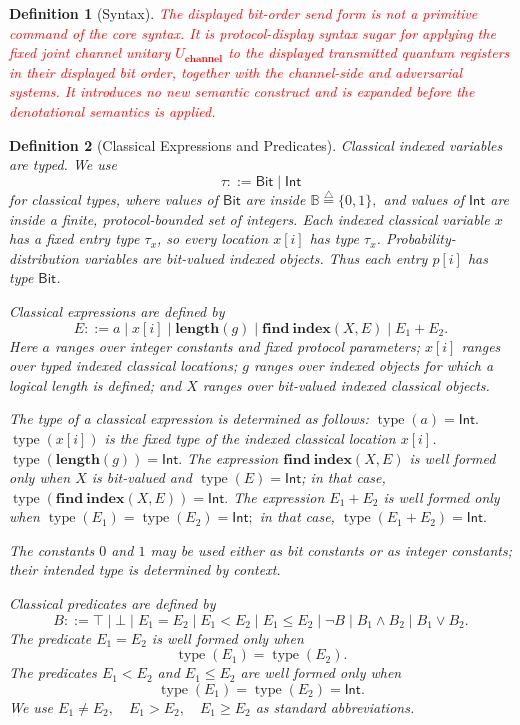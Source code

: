 \documentclass[acmsmall,screen,review,anonymous,nonacm]{acmart}
\newtheorem{definition}{Definition}[section]
\theoremstyle{defn_style}
\begin{document}
\begin{definition}[Syntax]
\textcolor{red}{The displayed bit-order send form is not a primitive command of the core syntax.  It is protocol-display syntax sugar for applying the fixed joint channel unitary \(U_{\textbf{channel}}\) to the displayed transmitted quantum registers in their displayed bit order, together with the channel-side and adversarial systems.  It introduces no new semantic construct and is expanded before the denotational semantics is applied.}
\end{definition}


\begin{definition}[Classical Expressions and Predicates]

Classical indexed variables are typed. We use
\[
\tau ::= \mathsf{Bit}\mid \mathsf{Int}
\]
for classical types, where
values of \(\mathsf{Bit}\) are inside \(
\mathbb B
\stackrel{\triangle}{=}
\{0,1\},\)
and values of \({\mathsf{Int}}\) are inside a finite, protocol-bounded set of integers. Each indexed classical variable \(x\) has a fixed entry type
\(\tau_x\), so every location \(x[i]\) has type \(\tau_x\). Probability-distribution variables are bit-valued indexed objects. Thus each
entry \(p[i]\) has type \(\mathsf{Bit}\).


Classical expressions are defined by
\[
E ::=
a
\mid x[i]
\mid \mathbf{length}(g)
\mid \mathbf{find~index}(X,E)
\mid E_1+E_2 .
\]
Here \(a\) ranges over integer constants and fixed protocol parameters;
\(x[i]\) ranges over typed indexed classical locations; \(g\) ranges over indexed objects for which a logical length is defined; and \(X\) ranges over
bit-valued indexed classical objects.

The type of a classical expression is determined as follows: \(\operatorname{type}(a)=\mathsf{Int}.\) \(\operatorname{type}(x[i])\) 
is the fixed type of the indexed classical location \(x[i]\). \(\operatorname{type}(\mathbf{length}(g))=\mathsf{Int}.\)
The expression \(\mathbf{find~index}(X,E)\)
is well formed only when \(X\) is bit-valued and
\(\operatorname{type}(E)=\mathsf{Int}\); in that case,
\(\operatorname{type}(\mathbf{find~index}(X,E))=\mathsf{Int}.\)
The expression \(E_1+E_2\) is well formed only when
\(\operatorname{type}(E_1)=\operatorname{type}(E_2)=\mathsf{Int};\)
in that case,
\(\operatorname{type}(E_1+E_2)=\mathsf{Int}.\)

The constants \(0\) and \(1\) may be used either as bit constants or as
integer constants; their intended type is determined by context.

Classical predicates are defined by
\[
B ::=
\top
\mid \bot
\mid E_1=E_2
\mid E_1<E_2
\mid E_1\leq E_2
\mid \neg B
\mid B_1\land B_2
\mid B_1\lor B_2 .
\]
The predicate \(E_1=E_2\) is well formed only when
\[
\operatorname{type}(E_1)=\operatorname{type}(E_2).
\]
The predicates \(E_1<E_2\) and \(E_1\leq E_2\) are well formed only when
\[
\operatorname{type}(E_1)=\operatorname{type}(E_2)=\mathsf{Int}.
\]
We use \(E_1\neq E_2,\quad
E_1>E_2,\quad
E_1\geq E_2\)
as standard abbreviations.
\end{definition}
\end{document}

